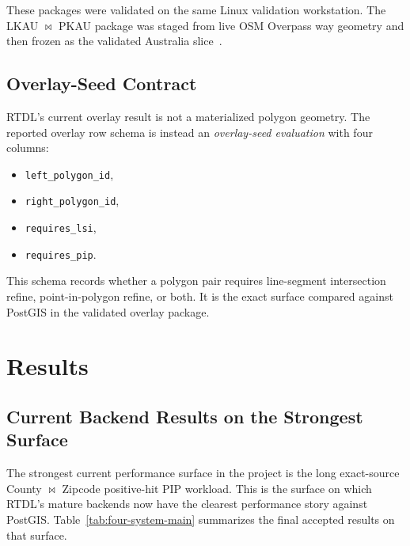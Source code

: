 \documentclass[conference]{IEEEtran}
\begin{document}
These packages were validated on the same Linux validation workstation. The
LKAU $\bowtie$ PKAU package was staged from live OSM Overpass way
geometry and then frozen as the validated Australia slice~\cite{overpass}.

\subsection{Overlay-Seed Contract}

RTDL's current overlay result is not a materialized polygon geometry. The
reported overlay row schema is instead an \emph{overlay-seed evaluation} with
four columns:
\begin{itemize}
\item \texttt{left\_polygon\_id},
\item \texttt{right\_polygon\_id},
\item \texttt{requires\_lsi},
\item \texttt{requires\_pip}.
\end{itemize}
This schema records whether a polygon pair requires line-segment intersection
refine, point-in-polygon refine, or both. It is the exact surface compared
against PostGIS in the validated overlay package.

\section{Results}

\subsection{Current Backend Results on the Strongest Surface}

The strongest current performance surface in the project is the long
exact-source County $\bowtie$ Zipcode positive-hit PIP workload. This is the
surface on which RTDL's mature backends now have the clearest performance story
against PostGIS. Table~\ref{tab:four-system-main} summarizes the final accepted
results on that surface.
\end{document}
